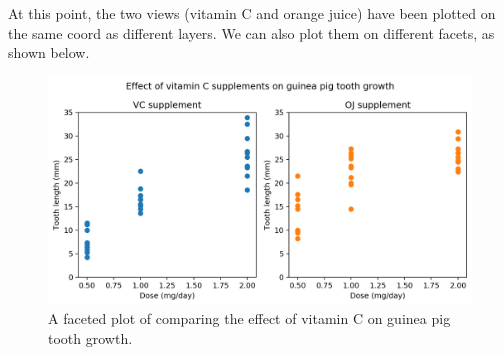 \documentclass[a4paper, openany]{memoir}
\begin{document}
At this point, the two views (vitamin C and orange juice) have been plotted on the same coord as different layers. We can also plot them on different facets, as shown below.
\begin{figure}[H]
    \centering
    \includegraphics[scale=0.5]{src/2.15 VitC Example Plot 5.png}
    \caption{A faceted plot of comparing the effect of vitamin C on guinea pig tooth growth.}
\end{figure}
\newpage
\end{document}
